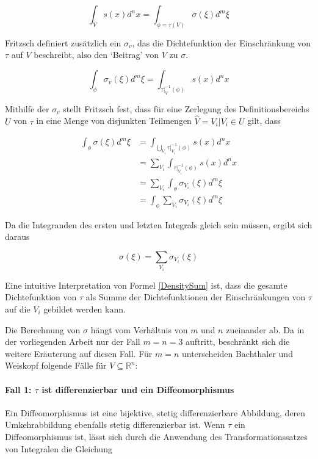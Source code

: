\documentclass[a4paper,fontsize=12pt,toc=bib,halfparskip]{scrartcl}
\begin{document}
\begin{equation}
	\int_{V}s(x)d^nx = \int_{\phi = \tau(V)}\sigma(\xi)d^m\xi
\end{equation}

Fritzsch \cite[S.~20~f.]{fritzsch2016continuousScatterplot} definiert zus\"atzlich ein $\sigma_v$, das die Dichtefunktion der Einschr\"ankung von $\tau$ auf $V$ beschreibt, also den `Beitrag' von $V$ zu $\sigma$.

\begin{equation}
	\int_{\phi} \sigma_v(\xi)d^m\xi = \int_{\tau|_V^{-1}(\phi)}s(x)d^nx
\end{equation}

Mithilfe der $\sigma_v$ stellt Fritzsch fest, dass f\"ur eine Zerlegung des Definitionsbereichs $U$ von $\tau$ in eine Menge von disjunkten Teilmengen $\hat{V} = {V_i | V_i \in U}$ gilt, dass

\begin{equation}
\begin{split}
\int_{\phi}\sigma(\xi)d^m\xi 
&= \int_{\bigcup\limits_{V_i}\tau|_{V_i}^{-1}(\phi)} s(x)d^nx
\\
&= \sum_{V_i}\int_{\tau|_{V_i}^{-1}(\phi)} s(x)d^nx
\\
&= \sum_{V_i}\int_{\phi}\sigma_{V_i}(\xi)d^m\xi
\\
&= \int_{\phi}\sum_{V_i}\sigma_{V_i}(\xi)d^m\xi
\end{split}
\end{equation}

Da die Integranden des ersten und letzten Integrals gleich sein m\"ussen, ergibt sich daraus

\begin{equation}
	\sigma(\xi) = \sum_{V_i}\sigma_{V_i}(\xi)
	\label{DensitySum}
\end{equation}

Eine intuitive Interpretation von Formel \ref{DensitySum} ist, dass die gesamte Dichtefunktion von $\tau$ als Summe der Dichtefunktionen der Einschr\"ankungen von $\tau$ auf die $V_i$ gebildet werden kann.

Die Berechnung von $\sigma$ h\"angt vom Verh\"altnis von $m$ und $n$ zueinander ab. Da in der vorliegenden Arbeit nur der Fall $m=n=3$ auftritt, beschr\"ankt sich die weitere Er\"auterung auf diesen Fall. F\"ur $m=n$ unterscheiden Bachthaler und Weiskopf folgende F\"alle f\"ur $V \subseteq \mathbb{R}^n$\cite[S.~1430]{bachthaler2008continuous}:

\paragraph{Fall 1: $\tau$ ist differenzierbar und ein Diffeomorphismus}
Ein Diffeomorphismus ist eine bijektive, stetig differenzierbare Abbildung, deren Umkehrabbildung ebenfalls stetig differenzierbar ist. 
Wenn $\tau$ ein Diffeomorphismus ist, l\"asst sich durch die Anwendung des Transformationssatzes von Integralen die Gleichung 
\end{document}

